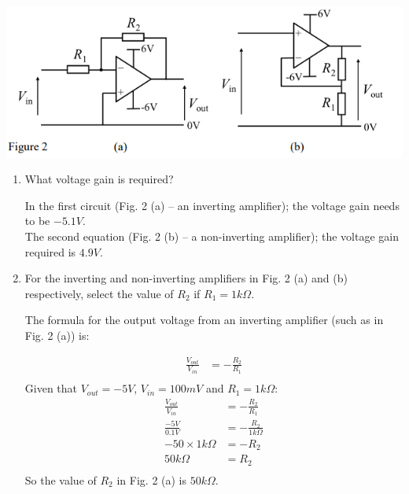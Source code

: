 \documentclass[10pt,\jkfside,a4paper]{article}
\begin{document}
\begin{enumerate}
\begin{center}
\includegraphics{3.25}
\end{center}

\begin{enumerate}

\item{What voltage gain is required?}

In the first circuit (Fig. 2 (a) -- an inverting amplifier); the voltage gain needs to be $-5.1V$.\\
The second equation (Fig. 2 (b) -- a non-inverting amplifier); the voltage gain required is $4.9V$.

\item{For the inverting and non-inverting amplifiers in Fig. 2 (a) and (b) 
respectively, select the value of $R_2$ if $R_1 = 1k\Omega$.}

The formula for the output voltage from an inverting amplifier (such as in Fig. 2 (a)) is:
\begin{center}
\begin{equation}
\begin{split}
\frac{V_{out}}{V_{in}} &= -\frac{R_2}{R_1}\\
\end{split}
\end{equation}
Given that $V_{out} = -5V$, $V_{in} = 100mV$ and $R_1 = 1k\Omega$:
\begin{equation}
\begin{split}
\frac{V_{out}}{V_{in}} &= -\frac{R_2}{R_1}\\
\frac{-5V}{0.1V} &= -\frac{R_2}{1k\Omega}\\
-50 \times 1k\Omega &= -R_2\\
50k\Omega &= R_2\\
\end{split}
\end{equation}
So the value of $R_2$ in Fig. 2 (a) is $50k\Omega$.
\end{center}


\end{enumerate}
\end{enumerate}
\end{document}
